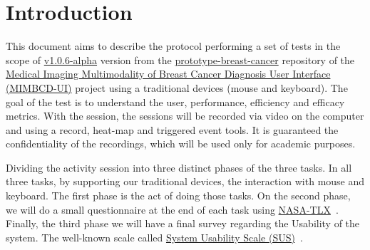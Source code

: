 
\section{Introduction}

This document aims to describe the protocol performing a set of tests in the scope of \hyperlink{https://github.com/MIMBCD-UI/prototype-breast-screening/releases/tag/v1.0.6-alpha}{v1.0.6-alpha} version from the \hyperlink{https://github.com/MIMBCD-UI/prototype-breast-cancer}{prototype-breast-cancer} repository of the \hyperlink{https://mimbcd-ui.github.io/}{Medical Imaging Multimodality of Breast Cancer Diagnosis User Interface (MIMBCD-UI)} project using a traditional devices (mouse and keyboard). The goal of the test is to understand the user, performance, efficiency and efficacy metrics. With the session, the sessions will be recorded via video on the computer and using a record, heat-map and triggered event tools. It is guaranteed the confidentiality of the recordings, which will be used only for academic purposes.

Dividing the activity session into three distinct phases of the three tasks. In all three tasks, by supporting our traditional devices, the interaction with mouse and keyboard. The first phase is the act of doing those tasks. On the second phase, we will do a small questionnaire at the end of each task using \hyperlink{https://en.wikipedia.org/wiki/NASA-TLX}{NASA-TLX}~\cite{ramkumar2017using}. Finally, the third phase we will have a final survey regarding the Usability of the system. The well-known scale called \hyperlink{https, therefore, support this phase://en.wikipedia.org/wiki/System_usability_scale}{System Usability Scale (SUS)}~\cite{orfanou2015perceived}.